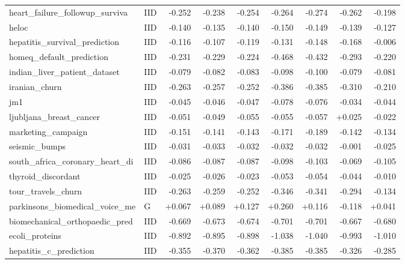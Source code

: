 \begin{longtable}{@{}p{3.95cm}lrrrrrrr@{}}
heart\_\allowbreak{}failure\_\allowbreak{}followup\_\allowbreak{}surviva & IID & -0.252 & -0.238 & -0.254 & -0.264 & -0.274 & -0.262 & -0.198\\
heloc & IID & -0.140 & -0.135 & -0.140 & -0.150 & -0.149 & -0.139 & -0.127\\
hepatitis\_\allowbreak{}survival\_\allowbreak{}prediction & IID & -0.116 & -0.107 & -0.119 & -0.131 & -0.148 & -0.168 & -0.006\\
homeq\_\allowbreak{}default\_\allowbreak{}prediction & IID & -0.231 & -0.229 & -0.224 & -0.468 & -0.432 & -0.293 & -0.220\\
indian\_\allowbreak{}liver\_\allowbreak{}patient\_\allowbreak{}dataset & IID & -0.079 & -0.082 & -0.083 & -0.098 & -0.100 & -0.079 & -0.081\\
iranian\_\allowbreak{}churn & IID & -0.263 & -0.257 & -0.252 & -0.386 & -0.385 & -0.310 & -0.210\\
jm1 & IID & -0.045 & -0.046 & -0.047 & -0.078 & -0.076 & -0.034 & -0.044\\
ljubljana\_\allowbreak{}breast\_\allowbreak{}cancer & IID & -0.051 & -0.049 & -0.055 & -0.055 & -0.057 & +0.025 & -0.022\\
marketing\_\allowbreak{}campaign & IID & -0.151 & -0.141 & -0.143 & -0.171 & -0.189 & -0.142 & -0.134\\
seismic\_\allowbreak{}bumps & IID & -0.031 & -0.033 & -0.032 & -0.032 & -0.032 & -0.001 & -0.025\\
south\_\allowbreak{}africa\_\allowbreak{}coronary\_\allowbreak{}heart\_\allowbreak{}di & IID & -0.086 & -0.087 & -0.087 & -0.098 & -0.103 & -0.069 & -0.105\\
thyroid\_\allowbreak{}discordant & IID & -0.025 & -0.026 & -0.023 & -0.053 & -0.054 & -0.044 & -0.010\\
tour\_\allowbreak{}travels\_\allowbreak{}churn & IID & -0.263 & -0.259 & -0.252 & -0.346 & -0.341 & -0.294 & -0.134\\
parkinsons\_\allowbreak{}biomedical\_\allowbreak{}voice\_\allowbreak{}me & G & +0.067 & +0.089 & +0.127 & +0.260 & +0.116 & -0.118 & +0.041\\
\midrule
biomechanical\_\allowbreak{}orthopaedic\_\allowbreak{}pred & IID & -0.669 & -0.673 & -0.674 & -0.701 & -0.701 & -0.667 & -0.680\\
ecoli\_\allowbreak{}proteins & IID & -0.892 & -0.895 & -0.898 & -1.038 & -1.040 & -0.993 & -1.010\\
hepatitis\_\allowbreak{}c\_\allowbreak{}prediction & IID & -0.355 & -0.370 & -0.362 & -0.385 & -0.385 & -0.326 & -0.285\\

\end{longtable}

